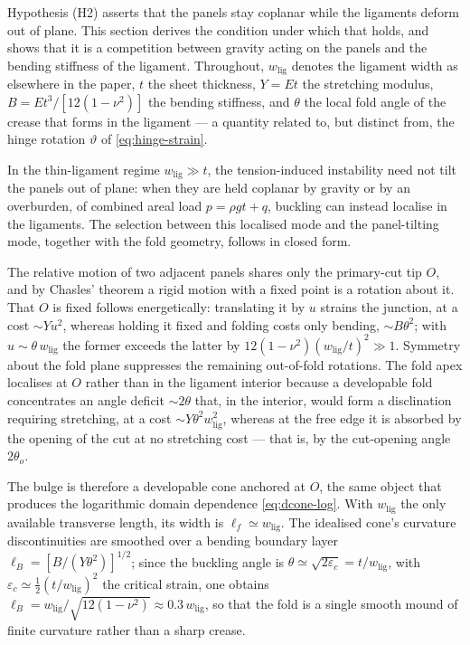 \documentclass[pdflatex,sn-mathphys-num]{sn-jnl}%
\theoremstyle{thmstyleone}%
\theoremstyle{thmstyletwo}%
\theoremstyle{thmstylethree}%
\newcommand{\wlig}{w_{\mathrm{lig}}}
\begin{document}
Hypothesis (H2) asserts that the panels stay coplanar while the ligaments deform
out of plane. This section derives the condition under which that holds, and shows
that it is a competition between gravity acting on the panels and the bending
stiffness of the ligament. Throughout, $\wlig$ denotes the ligament width as
elsewhere in the paper, $t$ the sheet thickness, $Y=Et$ the stretching modulus,
$B=Et^{3}/[12(1-\nu^{2})]$ the bending stiffness, and $\theta$ the local fold
angle of the crease that forms in the ligament --- a quantity related to, but
distinct from, the hinge rotation $\vartheta$ of \eqref{eq:hinge-strain}.

In the thin-ligament regime $\wlig\gg t$, the tension-induced instability need not
tilt the panels out of plane: when they are held coplanar by gravity or by an
overburden, of combined areal load $p=\rho g t+q$, buckling can instead localise
in the ligaments. The selection between this localised mode and the panel-tilting
mode, together with the fold geometry, follows in closed form.

The relative motion of two adjacent panels shares only the primary-cut tip $O$,
and by Chasles' theorem a rigid motion with a fixed point is a rotation about it.
That $O$ is fixed follows energetically: translating it by $u$ strains the
junction, at a cost $\sim Y u^{2}$, whereas holding it fixed and folding costs only
bending, $\sim B\theta^{2}$; with $u\sim\theta\,\wlig$ the former exceeds the
latter by $12(1-\nu^{2})(\wlig/t)^{2}\gg1$. Symmetry about the fold plane
suppresses the remaining out-of-fold rotations. The fold apex localises at $O$
rather than in the ligament interior because a developable fold concentrates an
angle deficit $\sim2\theta$ that, in the interior, would form a disclination
requiring stretching, at a cost $\sim Y\theta^{2}\wlig^{2}$, whereas at the free
edge it is absorbed by the opening of the cut at no stretching cost --- that is,
by the cut-opening angle $2\theta_{o}$.

The bulge is therefore a developable cone anchored at $O$, the same object that
produces the logarithmic domain dependence \eqref{eq:dcone-log}. With $\wlig$ the
only available transverse length, its width is $\ell_f\simeq\wlig$. The idealised
cone's curvature discontinuities are smoothed over a bending boundary layer
$\ell_B=[B/(Y\theta^{2})]^{1/2}$; since the buckling angle is
$\theta\simeq\sqrt{2\varepsilon_c}=t/\wlig$, with
$\varepsilon_c\simeq\tfrac12(t/\wlig)^{2}$ the critical strain, one obtains
$\ell_B=\wlig/\sqrt{12(1-\nu^{2})}\approx0.3\,\wlig$, so that the fold is a single
smooth mound of finite curvature rather than a sharp crease.
\end{document}
